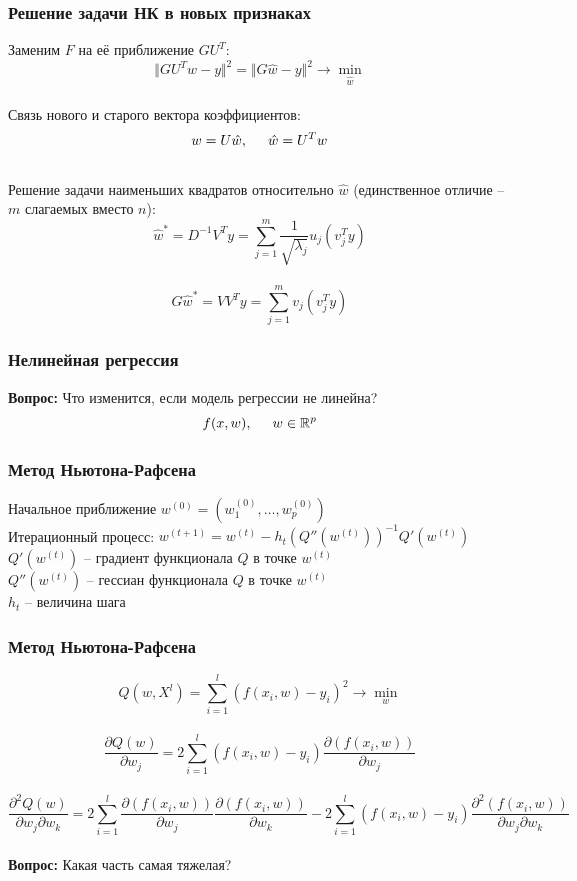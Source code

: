 \documentclass[12pt, aspectratio=169]{beamer}
\begin{document}
\begin{frame}\frametitle{Решение задачи НК в новых признаках}
Заменим $F$ на её приближение $GU^T$:\\
$$\Vert GU^Tw -y \Vert^2 = \Vert G\hat{w} -y \Vert^2 \rightarrow \min\limits_{\hat{w}}$$\\
Связь нового и старого вектора коэффициентов:\\
$$w = U\hat{w}, \hspace{5mm} \hat{w} = U^T w$$\\
Решение задачи наименьших квадратов относительно $\hat{w}$ (единственное отличие -- $m$ слагаемых вместо $n$):\\
$$\hat{w}^* = D^{-1}V^Ty = \sum\limits_{j=1}^m \frac{1}{\sqrt{\lambda_j}} u_j (v_j^Ty)$$\\
$$G\hat{w}^* = VV^Ty = \sum\limits_{j=1}^m v_j (v_j^Ty)$$
\end{frame}

\begin{frame}\frametitle{Нелинейная регрессия}
\textbf{Вопрос:} Что изменится, если модель регрессии не линейна?\\
\vspace{5mm}
$$f(x, w), \hspace{5mm} w \in \mathbb{R}^p$$
\end{frame}


\begin{frame}\frametitle{Метод Ньютона-Рафсена}
Начальное приближение $w^{(0)} = (w_1^{(0)}, \dots, w_p^{(0)})$\\
Итерационный процесс: $w^{(t+1)} = w^{(t)} - h_t (Q''(w^{(t)}))^{-1}Q'(w^{(t)})$\\
\vspace{5mm}
$Q'(w^{(t)})$ -- градиент функционала $Q$ в точке $w^{(t)}$\\
$Q''(w^{(t)})$ -- гессиан функционала $Q$ в точке $w^{(t)}$\\
$h_t$ -- величина шага
\end{frame}

\begin{frame}\frametitle{Метод Ньютона-Рафсена}
$$Q(w,X^l) = \sum\limits_{i=1}^l (f (x_i, w) - y_i)^2 \rightarrow \min\limits_{w}$$\\

$$\frac{\partial Q(w)}{\partial w_j} = 2 \sum\limits_{i=1}^l (f(x_i, w) - y_i ) \frac{\partial(f(x_i, w))}{\partial w_j}$$\\
$$\frac{\partial^2 Q(w)}{\partial w_j \partial w_k} = 2 \sum\limits_{i=1}^l \frac{\partial(f(x_i, w))}{\partial w_j} \frac{\partial(f(x_i, w))}{\partial w_k} - 2 \sum\limits_{i=1}^l (f(x_i, w) - y_i ) \frac{\partial^2 (f(x_i, w))}{\partial w_j \partial w_k}$$\\
\vspace{5mm}
\textbf{Вопрос:} Какая часть самая тяжелая?
\end{frame}
\end{document}
